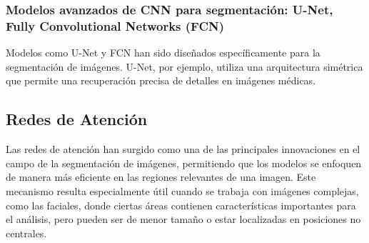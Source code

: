 \subsubsection{Modelos avanzados de CNN para segmentación: U-Net, Fully Convolutional Networks (FCN)}
Modelos como U-Net y FCN han sido diseñados específicamente para la segmentación de imágenes. U-Net, por ejemplo, utiliza una arquitectura simétrica que permite una recuperación precisa de detalles en imágenes médicas. \parencite{ronneberger2015}



\subsection{Redes de Atención}  
Las redes de atención han surgido como una de las principales innovaciones en el campo de la segmentación de imágenes, permitiendo que los modelos se enfoquen de manera más eficiente en las regiones relevantes de una imagen. Este mecanismo resulta especialmente útil cuando se trabaja con imágenes complejas, como las faciales, donde ciertas áreas contienen características importantes para el análisis, pero pueden ser de menor tamaño o estar localizadas en posiciones no centrales.

